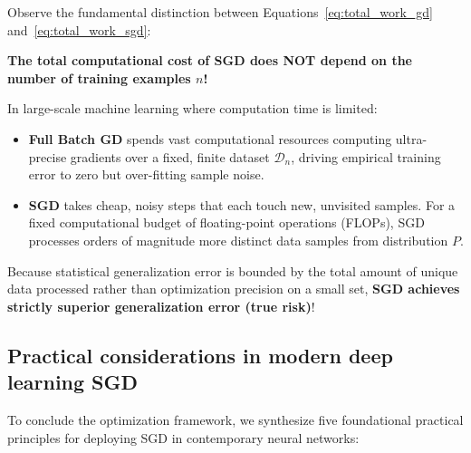 \begin{examinsight}
Observe the fundamental distinction between Equations~\eqref{eq:total_work_gd} and~\eqref{eq:total_work_sgd}:
\begin{center}
\textbf{The total computational cost of SGD does NOT depend on the number of training examples $n$!}
\end{center}
In large-scale machine learning where computation time is limited:
\begin{itemize}[noitemsep]
  \item \textbf{Full Batch GD} spends vast computational resources computing ultra-precise gradients over a fixed, finite dataset $\mathcal{D}_n$, driving empirical training error to zero but over-fitting sample noise.
  \item \textbf{SGD} takes cheap, noisy steps that each touch new, unvisited samples. For a fixed computational budget of floating-point operations (FLOPs), SGD processes orders of magnitude more distinct data samples from distribution $P$.
\end{itemize}
Because statistical generalization error is bounded by the total amount of unique data processed rather than optimization precision on a small set, \textbf{SGD achieves strictly superior generalization error (true risk)}!
\end{examinsight}

\subsection{Practical considerations in modern deep learning SGD}
\label{sec:practical_sgd_deep_learning}

To conclude the optimization framework, we synthesize five foundational practical principles for deploying SGD in contemporary neural networks:

